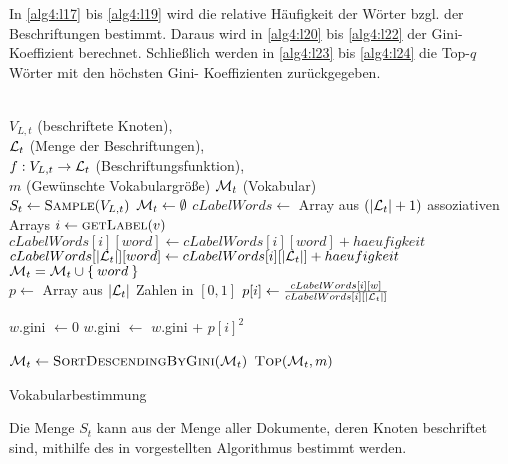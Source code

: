 In \cref{alg4:l17} bis \ref{alg4:l19} wird die relative Häufigkeit der Wörter
bzgl. der Beschriftungen bestimmt. Daraus wird in \cref{alg4:l20} bis
\ref{alg4:l22} der Gini-Koeffizient berechnet. Schließlich werden in
\cref{alg4:l23} bis \ref{alg4:l24} die Top-$q$ Wörter mit den höchsten Gini-
Koeffizienten zurückgegeben.

\begin{algorithm}[ht]
    \begin{algorithmic}[1]
        \Require \\
                 $V_{L,t}$ (beschriftete Knoten),\\
                 $\mathcal{L}_t$ (Menge der Beschriftungen),\\
                 $f:V_{L,t} \rightarrow \mathcal{L}_t$ (Beschriftungsfunktion),\\
                 $m$ (Gewünschte Vokabulargröße)
        \Ensure  $\mathcal{M}_t$ (Vokabular)\\
        \State $S_t \gets \Call{Sample}{V_{L,t}}$\label{alg4:l6} 
        \State $\mathcal{M}_t \gets \emptyset$ 
        \State $cLabelWords \gets$ Array aus $(|\mathcal{L}_t|+1)$ assoziativen Arrays\label{alg4:l8}
         \label{alg4:l10}
            \State $i \gets \Call{getLabel}{v}$
                \State $cLabelWords[i][word] \gets cLabelWords[i][word] + haeufigkeit$
                \State $cLabelWords[|\mathcal{L}_t|][word] \gets cLabelWords[i][|\mathcal{L}_t|] + haeufigkeit$
                \State $\mathcal{M}_t = \mathcal{M}_t \cup \Set{word}$
            \EndFor
        \EndFor\label{alg4:l12}
		\\
            \State $p \gets $ Array aus $|\mathcal{L}_t|$ Zahlen in $[0, 1]$\label{alg4:l17}
                \State $p[i] \gets \frac{cLabelWords[i][w]}{cLabelWords[i][|\mathcal{L}_t|]}$
            \EndFor\label{alg4:l19}

            \State $w$.gini $\gets 0$ \label{alg4:l20}
                \State $w$.gini $\gets$ $w$.gini + $p[i]^2$
            \EndFor\label{alg4:l22}
        \EndFor

        \State $\M_t \gets \Call{SortDescendingByGini}{\M_t}$\label{alg4:l23}
        \State \Return $\Call{Top}{\M_t, m}$\label{alg4:l24}
    \end{algorithmic}
\caption{Vokabularbestimmung}
\label{alg:vokabularbestimmung}
\end{algorithm}

Die Menge $S_t$ kann aus der Menge aller Dokumente, deren Knoten beschriftet
sind, mithilfe des in \cite{Vitter} vorgestellten Algorithmus bestimmt werden.

